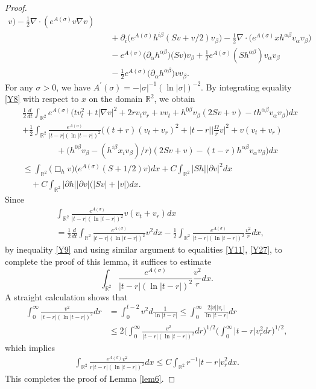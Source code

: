 \documentclass[11pt, reqno]{amsart}
\theoremstyle{definition}
\theoremstyle{remark}
\theoremstyle{definition}
\numberwithin{equation}{section}
\numberwithin{equation}{section}
\def\leq{\leqslant}
\begin{document}
\begin{proof}
\begin{align}
v)-\frac12\nabla\cdot(e^{A(\sigma)}v\nabla
v)\nonumber\\&\quad+\partial_i\big(e^{A(\sigma)}h^{i\beta}(Sv+v/2)v_{\beta}\big)
-\frac12\nabla\cdot\big(e^{A(\sigma)}xh^{\alpha\beta}v_{\alpha}v_{\beta}\big)
\nonumber\\&\quad-e^{A(\sigma)}\big(\partial_{\alpha}h^{\alpha\beta}\big)\big(Sv\big)v_{\beta}
+\frac12e^{A(\sigma)}(Sh^{\alpha\beta})v_{\alpha}v_{\beta}
\nonumber\\&\quad-\frac12e^{A(\sigma)}\big(\partial_{\alpha}h^{\alpha\beta}\big)vv_{\beta}.
\end{align}
For any $\sigma>0$, we have
$A^{'}(\sigma)=-|\sigma|^{-1}(\ln|\sigma|)^{-2}$. By integrating
equality \eqref{Y8} with respect to $x$ on the domain $\mathbb R^2$,
we obtain
\begin{align}\label{Y9}
&\frac12\frac{d}{dt}\int_{\mathbb
R^2}e^{A(\sigma)}\Big(tv_t^2+t|\nabla
v|^2+2rv_tv_r+vv_t+h^{0\beta}v_{\beta}(2Sv+v)-th^{\alpha\beta}v_{\alpha}v_{\beta}\Big)dx
\nonumber\\&+\frac12\int_{\mathbb
R^2}\frac{e^{A(\sigma)}}{|t-r|(\ln|t-r|)^2}
\Big((t+r)(v_t+v_r)^2+|t-r|\Big|\frac{\Omega}rv\Big|^2+v(v_t+v_r)\nonumber\\
&\qquad\qquad+\big(h^{0\beta}v_{\beta}
-(h^{i\beta}x_iv_{\beta})/r\big)(2Sv+v)-(t-r)h^{\alpha\beta}v_{\alpha}v_{\beta}\Big)dx
\nonumber\\&\leq\int_{\mathbb R^2}\big(\Box_h v\big)
\big(e^{A(\sigma)}(S+1/2)v\big)dx+C\int_{\mathbb R^2}|Sh||\partial
v|^2dx \nonumber\\&\quad+C\int_{\mathbb R^2}|\partial h||\partial
v|\big(|Sv|+|v|\big)dx.
\end{align}
Since
\begin{align*}
&\int_{\mathbb R^2}\frac{e^{A(\sigma)}}{|t-r|(\ln|t-r|)^2}v(v_t+v_r)dx
\\&=\frac12\frac{d}{dt}\int_{\mathbb R^2}\frac{e^{A(\sigma)}}{|t-r|(\ln|t-r|)^2}v^2dx
-\frac12\int_{\mathbb R^2}\frac{e^{A(\sigma)}}{|t-r|(\ln|t-r|)^2}\frac{v^2}rdx,
\end{align*}
by inequality \eqref{Y9} and using similar argument to equalities
\eqref{Y11}, \eqref{Y27}, to complete the proof of this lemma, it
suffices to estimate 
\[
\int_{\mathbb
R^2}\frac{e^{A(\sigma)}}{|t-r|(\ln|t-r|)^2}\frac{v^2}rdx.
\]
 A
straight calculation shows that
\begin{align*}
\int_0^{\infty}\frac{v^2}{|t-r|(\ln|t-r|)^2}dr&=\int_0^{t-2}v^2d\frac1{\ln|t-r|}
\leq \int_0^{\infty}\frac{2|v||v_r|}{\ln|t-r|}dr
\\&\leq 2\Big(\int_0^{\infty}\frac{v^2}{|t-r|(\ln|t-r|)^2}dr\Big)^{1/2}\Big(\int_0^{\infty}|t-r|v_r^2dr\Big)^{1/2},
\end{align*}
which implies
\begin{align*}
\int_{\mathbb R^2}\frac{e^{A(\sigma)}v^2}{r|t-r|(\ln|t-r|)^2}dx
\leq C\int_{\mathbb R^2}r^{-1}|t-r|v_r^2dx.
\end{align*}
This completes the proof of Lemma \ref{lem6}.
\end{proof}
\end{document}
